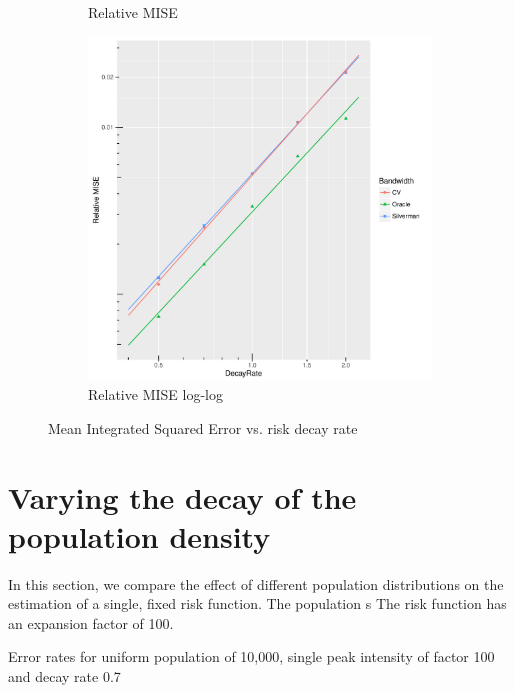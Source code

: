 \begin{figure}[htbp]
\begin{subfigure}[b]{0.3\textwidth}
    \caption{Relative MISE}
    \end{subfigure}
    \begin{subfigure}[b]{0.3\textwidth}
    \includegraphics[width=\textwidth]{results/by_cases_decay/RMISE-vs-risk-decay-log-log}
    \caption{Relative MISE log-log}
    \end{subfigure}
    \caption[MISE: by risk decay]{Mean Integrated Squared Error vs. risk decay rate}
    \label{fig:ise:unif_100_SD}
\end{figure}

\section{Varying the decay of the population density}
\label{sec:results:pSD_100_1h}

In this section, we compare the effect of different population distributions on the estimation of a single, fixed risk function.
The population s
The risk function has an expansion factor of 100.

\begin{table}[htbp]
\centering

\caption{Error rates for uniform population of 10,000, single peak intensity of factor 100 and decay rate 0.7}
\label{tab:results:p0.7_100_1.0_1h}
\end{table}


